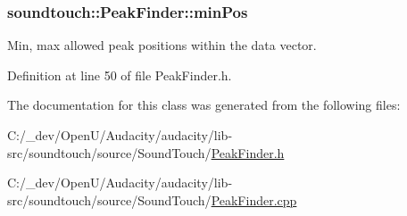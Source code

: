 \subsubsection[{\texorpdfstring{min\+Pos}{minPos}}]{ soundtouch\+::\+Peak\+Finder\+::min\+Pos\hspace{0.3cm}{\ttfamily [protected]}}\hypertarget{classsoundtouch_1_1_peak_finder_af0e19e7db5bf28173e0625b730d8e86d}{}\label{classsoundtouch_1_1_peak_finder_af0e19e7db5bf28173e0625b730d8e86d}


Min, max allowed peak positions within the data vector. 



Definition at line 50 of file Peak\+Finder.\+h.



The documentation for this class was generated from the following files\+:\begin{DoxyCompactItemize}
\item 
C\+:/\+\_\+dev/\+Open\+U/\+Audacity/audacity/lib-\/src/soundtouch/source/\+Sound\+Touch/\hyperlink{_peak_finder_8h}{Peak\+Finder.\+h}\item 
C\+:/\+\_\+dev/\+Open\+U/\+Audacity/audacity/lib-\/src/soundtouch/source/\+Sound\+Touch/\hyperlink{_peak_finder_8cpp}{Peak\+Finder.\+cpp}\end{DoxyCompactItemize}
